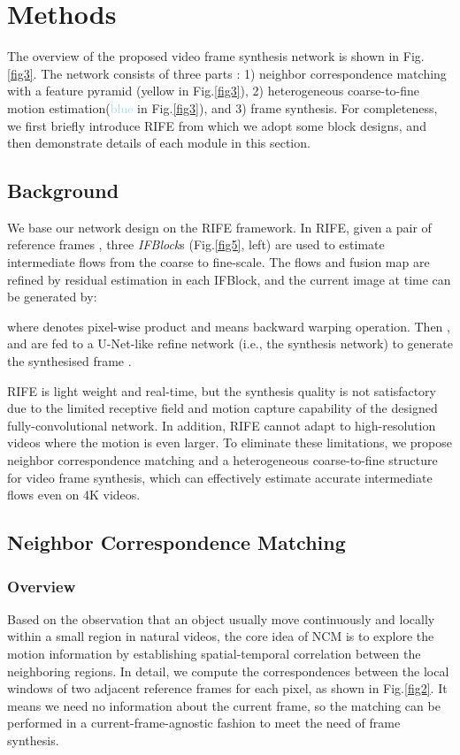 \documentclass[sigconf]{acmart}
\begin{document}
\section{Methods}
\label{sec:methods}
The overview of the proposed video frame synthesis network is shown in Fig.\ref{fig3}. The network consists of three parts : 1) neighbor correspondence matching with a feature pyramid (\textcolor{lightgold}{yellow} in Fig.\ref{fig3}), 2) heterogeneous coarse-to-fine motion estimation(\textcolor{lightblue}{blue} in Fig.\ref{fig3}), and 3) frame synthesis. For completeness, we first briefly introduce RIFE \cite{huang2020rife} from which we adopt some block designs, and then demonstrate details of each module in this section.


\subsection{Background}
\label{sec:3-0}
We base our network design on the RIFE \cite{huang2020rife} framework. In RIFE, given a pair of reference frames , three \textit{IFBlock}s (Fig.\ref{fig5}, left) are used to estimate intermediate flows from the coarse to fine-scale. The flows  and fusion map  are refined by residual estimation in each IFBlock, and the current image at time  can be generated by:

where  denotes pixel-wise product and  means backward warping operation. Then ,  and  are fed to a U-Net-like refine network (i.e., the synthesis network) to generate the synthesised frame . 

RIFE is light weight and real-time, but the synthesis quality is not satisfactory due to the limited receptive field and motion capture capability of the designed fully-convolutional network. In addition, RIFE cannot adapt to high-resolution videos where the motion is even larger. To eliminate these limitations, we propose neighbor correspondence matching and a heterogeneous coarse-to-fine structure for video frame synthesis, which can effectively estimate accurate intermediate flows even on 4K videos.

\subsection{Neighbor Correspondence Matching}
\label{sec:3-1}

\subsubsection{Overview}
Based on the observation that an object usually move continuously and locally within a small region in natural videos, the core idea of NCM is to explore the motion information by establishing spatial-temporal correlation between the neighboring regions. In detail, we compute the correspondences between the local windows of two adjacent reference frames for each pixel, as shown in Fig.\ref{fig2}. It means we need no information about the current frame, so the matching can be performed in a current-frame-agnostic fashion to meet the need of frame synthesis. 
\end{document}
